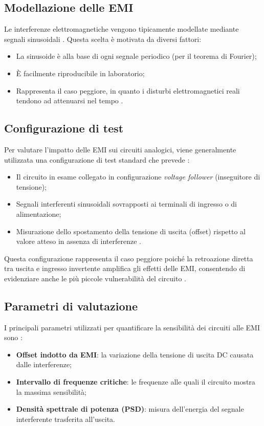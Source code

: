\subsection{Modellazione delle EMI}
Le interferenze elettromagnetiche vengono tipicamente modellate mediante segnali sinusoidali \cite{capitolo2}. Questa scelta è motivata da diversi fattori:
\begin{itemize}
    \item La sinusoide è alla base di ogni segnale periodico (per il teorema di Fourier);
    \item È facilmente riproducibile in laboratorio;
    \item Rappresenta il caso peggiore, in quanto i disturbi elettromagnetici reali tendono ad attenuarsi nel tempo \cite{capitolo2}.
\end{itemize}

\subsection{Configurazione di test}
Per valutare l'impatto delle EMI sui circuiti analogici, viene generalmente utilizzata una configurazione di test standard che prevede \cite{finalprint, Redoute-Richelli_EMC_Magazine}:
\begin{itemize}
    \item Il circuito in esame collegato in configurazione \textit{voltage follower} (inseguitore di tensione);
    \item Segnali interferenti sinusoidali sovrapposti ai terminali di ingresso o di alimentazione;
    \item Misurazione dello spostamento della tensione di uscita (offset) rispetto al valore atteso in assenza di interferenze \cite{Measurements_of_EMI_susceptibility_of_precision_voltage_references}.
\end{itemize}

Questa configurazione rappresenta il caso peggiore poiché la retroazione diretta tra uscita e ingresso invertente amplifica gli effetti delle EMI, consentendo di evidenziare anche le più piccole vulnerabilità del circuito \cite{Redoute-Richelli_EMC_Magazine}.

\subsection{Parametri di valutazione}
I principali parametri utilizzati per quantificare la sensibilità dei circuiti alle EMI sono \cite{Bulk-Driven_CMOS_Amplifier_With_High_EMI_Immunity, TR2016}:
\begin{itemize}
    \item \textbf{Offset indotto da EMI}: la variazione della tensione di uscita DC causata dalle interferenze;
    \item \textbf{Intervallo di frequenze critiche}: le frequenze alle quali il circuito mostra la massima sensibilità;
    \item \textbf{Densità spettrale di potenza (PSD)}: misura dell'energia del segnale interferente trasferita all'uscita.
\end{itemize}

